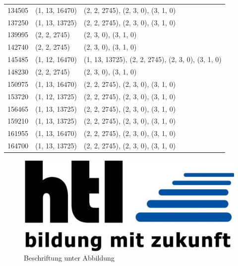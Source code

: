 \begin{longtable}{|l|l|l|}
	134505 & (1, 13, 16470) & (2, 2, 2745), (2, 3, 0), (3, 1, 0) \\
	137250 & (1, 13, 13725) & (2, 2, 2745), (2, 3, 0), (3, 1, 0) \\
	139995 & (2, 2, 2745) & (2, 3, 0), (3, 1, 0) \\
	142740 & (2, 2, 2745) & (2, 3, 0), (3, 1, 0) \\
	145485 & (1, 12, 16470) & (1, 13, 13725), (2, 2, 2745), (2, 3, 0), (3, 1, 0) \\
	148230 & (2, 2, 2745) & (2, 3, 0), (3, 1, 0) \\
	150975 & (1, 13, 16470) & (2, 2, 2745), (2, 3, 0), (3, 1, 0) \\
	153720 & (1, 12, 13725) & (2, 2, 2745), (2, 3, 0), (3, 1, 0) \\
	156465 & (1, 13, 13725) & (2, 2, 2745), (2, 3, 0), (3, 1, 0) \\
	159210 & (1, 13, 13725) & (2, 2, 2745), (2, 3, 0), (3, 1, 0) \\
	161955 & (1, 13, 16470) & (2, 2, 2745), (2, 3, 0), (3, 1, 0) \\
	164700 & (1, 13, 13725) & (2, 2, 2745), (2, 3, 0), (3, 1, 0) \\
	
\end{longtable} 


\begin{figure}[b] %
	\centering
	\includegraphics[width=0.6\linewidth]{img/htl_logo.jpg}
	\caption[Beschreibung für Verzeichnis]{Beschriftung unter Abbildung\footnotemark}
\end{figure}


\blindtext[3]
